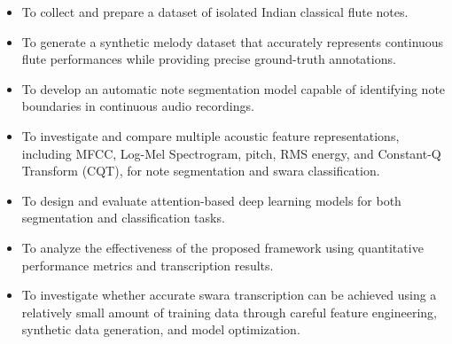 \begin{itemize}
    \item To collect and prepare a dataset of isolated Indian classical flute notes.
    \item To generate a synthetic melody dataset that accurately represents continuous flute performances while providing precise ground-truth annotations.
    \item To develop an automatic note segmentation model capable of identifying note boundaries in continuous audio recordings.
    \item To investigate and compare multiple acoustic feature representations, including MFCC, Log-Mel Spectrogram, pitch, RMS energy, and Constant-Q Transform (CQT), for note segmentation and swara classification.
    \item To design and evaluate attention-based deep learning models for both segmentation and classification tasks.
    \item To analyze the effectiveness of the proposed framework using quantitative performance metrics and transcription results.
    \item To investigate whether accurate swara transcription can be achieved using a relatively small amount of training data through careful feature engineering, synthetic data generation, and model optimization.
\end{itemize}
